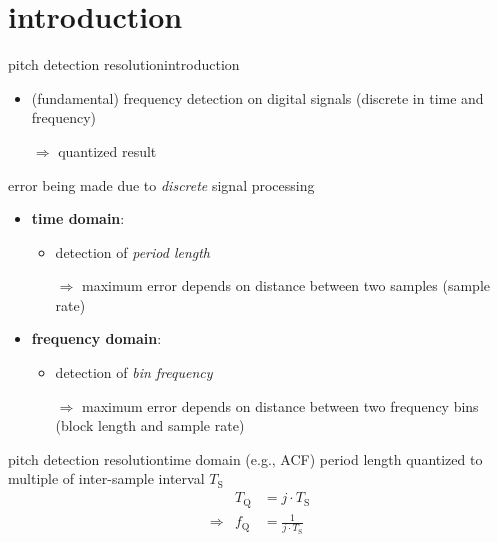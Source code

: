     \section[intro]{introduction}
        \begin{frame}{pitch detection resolution}{introduction}
            \begin{itemize}
                \item (fundamental) frequency detection on digital signals (discrete in time and frequency)
                \item[$\Rightarrow$] quantized result
            \end{itemize}
            
            \pause
            
            error being made due to \textit{discrete} signal processing
            
            \begin{itemize}
                \item   \textbf{time domain}:
                    \begin{itemize}
                        \item   detection of \textit{period length}
                        \item[$\Rightarrow$] maximum error depends on distance between two samples (sample rate)
                    \end{itemize}
                \bigskip
                \item<3->   \textbf{frequency domain}:
                    \begin{itemize}
                        \item detection of \textit{bin frequency}
                        \item[$\Rightarrow$] maximum error depends on distance between two frequency bins (block length and sample rate)
                    \end{itemize}
            \end{itemize}
        \end{frame}
        \begin{frame}{pitch detection resolution}{time domain (e.g., ACF)}
            \vspace{-2mm}
            period length quantized to multiple of inter-sample interval $T_\mathrm{S}$
            \begin{eqnarray*}
                &T_\mathrm{Q} &= j\cdot T_{\mathrm{S}}\\
                \Rightarrow &f_\mathrm{Q} &= \frac{1}{j\cdot T_{\mathrm{S}}}
            \end{eqnarray*}
            \vspace{-5mm}
        \end{frame}

